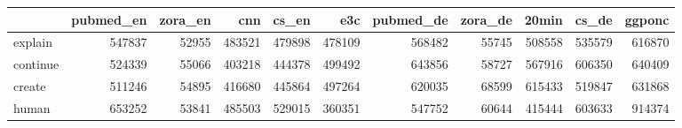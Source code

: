 \begin{tabular}{lrrrrrrrrrr}
\toprule
{} &  pubmed\_en &  zora\_en &     cnn &   cs\_en &     e3c &  pubmed\_de &  zora\_de &   20min &   cs\_de &  ggponc \\
\midrule
explain  &     547837 &    52955 &  483521 &  479898 &  478109 &     568482 &    55745 &  508558 &  535579 &  616870 \\
continue &     524339 &    55066 &  403218 &  444378 &  499492 &     643856 &    58727 &  567916 &  606350 &  640409 \\
create   &     511246 &    54895 &  416680 &  445864 &  497264 &     620035 &    68599 &  615433 &  519847 &  631868 \\
human    &     653252 &    53841 &  485503 &  529015 &  360351 &     547752 &    60644 &  415444 &  603633 &  914374 \\
\bottomrule
\end{tabular}
